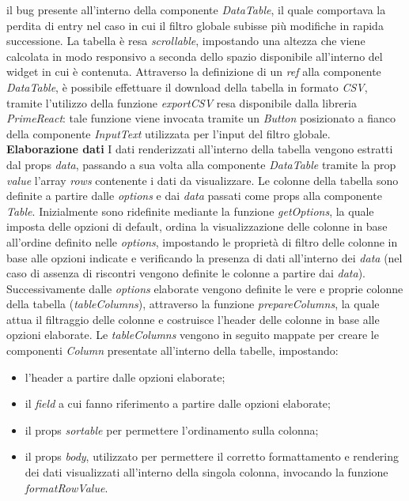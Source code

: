 il bug presente all'interno della componente \textit{DataTable}, il quale comportava la perdita di entry nel caso in cui il filtro globale subisse
più modifiche in rapida successione. \newline
La tabella è resa \textit{scrollable}, impostando una altezza che viene calcolata in modo responsivo a seconda dello spazio disponibile
all'interno del widget in cui è contenuta. \newline
Attraverso la definizione di un \textit{ref} alla componente \textit{DataTable}, è possibile effettuare il download della tabella in formato
\textit{CSV}, tramite l'utilizzo della funzione \textit{exportCSV} resa disponibile dalla libreria \textit{PrimeReact}: tale funzione viene
invocata tramite un \textit{Button} posizionato a fianco della componente \textit{InputText} utilizzata per l'input del filtro globale. \newline
\textbf{Elaborazione dati}\newline
I dati renderizzati all'interno della tabella vengono estratti dal props \textit{data}, passando a sua volta alla componente \textit{DataTable}
tramite la prop \textit{value} l'array \textit{rows} contenente i dati da visualizzare. \newline
Le colonne della tabella sono definite a partire dalle \textit{options} e dai \textit{data} passati come props alla componente \textit{Table}.
Inizialmente sono ridefinite mediante la funzione \textit{getOptions}, la quale imposta delle opzioni di default, ordina la visualizzazione delle colonne
in base all'ordine definito nelle \textit{options}, impostando le proprietà di filtro delle colonne in base alle opzioni indicate e verificando la presenza
di dati all'interno dei \textit{data} (nel caso di assenza di riscontri vengono definite le colonne a partire dai \textit{data}).
Successivamente dalle \textit{options} elaborate vengono definite le vere e proprie colonne della tabella (\textit{tableColumns}), attraverso la funzione \textit{prepareColumns},
la quale attua il filtraggio delle colonne e costruisce l'header delle colonne in base alle opzioni elaborate. \newline
Le \textit{tableColumns} vengono in seguito mappate per creare le componenti \textit{Column} presentate all'interno della tabelle, impostando:
\begin{itemize}
    \item l'header a partire dalle opzioni elaborate;
    \item il \textit{field} a cui fanno riferimento a partire dalle opzioni elaborate;
    \item il props \textit{sortable} per permettere l'ordinamento sulla colonna;
    \item il props \textit{body}, utilizzato per permettere il corretto formattamento e rendering dei dati visualizzati all'interno della singola colonna,
          invocando la funzione \textit{formatRowValue}.
\end{itemize}
